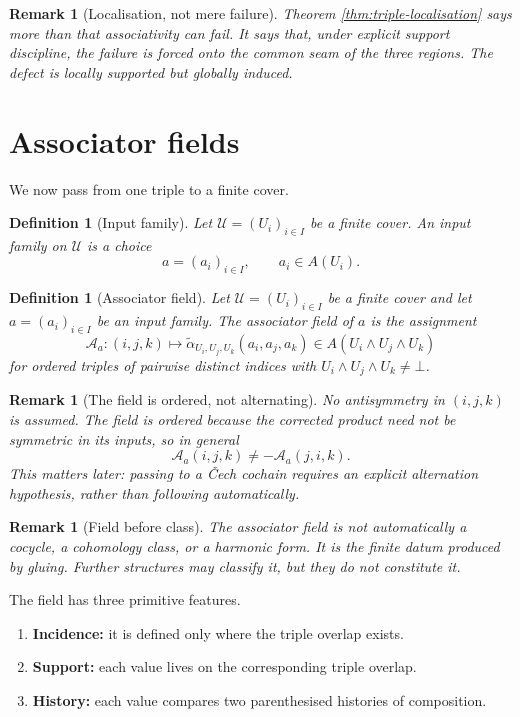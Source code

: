 \documentclass[11pt]{article}
\newtheorem{definition}[theorem]{Definition}
\newtheorem{remark}[theorem]{Remark}
\begin{document}
\begin{remark}[Localisation, not mere failure]
Theorem \ref{thm:triple-localisation} says more than that associativity can fail. It says that, under explicit support discipline, the failure is forced onto the common seam of the three regions. The defect is locally supported but globally induced.
\end{remark}

\section{Associator fields}

We now pass from one triple to a finite cover.

\begin{definition}[Input family]
Let \(\mathcal U=(U_i)_{i\in I}\) be a finite cover. An input family on \(\mathcal U\) is a choice
\[
a=(a_i)_{i\in I},
\qquad
 a_i\in A(U_i).
\]
\end{definition}

\begin{definition}[Associator field]
Let \(\mathcal U=(U_i)_{i\in I}\) be a finite cover and let \(a=(a_i)_{i\in I}\) be an input family. The associator field of \(a\) is the assignment
\[
\mathcal A_a:(i,j,k)\longmapsto
\widetilde\alpha_{U_i,U_j,U_k}(a_i,a_j,a_k)
\in A(U_i\wedge U_j\wedge U_k)
\]
for ordered triples of pairwise distinct indices with \(U_i\wedge U_j\wedge U_k\neq \bot\).
\end{definition}

\begin{remark}[The field is ordered, not alternating]
No antisymmetry in \((i,j,k)\) is assumed. The field is ordered because the corrected product need not be symmetric in its inputs, so in general
\[
\mathcal A_a(i,j,k)\neq -\mathcal A_a(j,i,k).
\]
This matters later: passing to a \v{C}ech cochain requires an explicit alternation hypothesis, rather than following automatically.
\end{remark}

\begin{remark}[Field before class]
The associator field is not automatically a cocycle, a cohomology class, or a harmonic form. It is the finite datum produced by gluing. Further structures may classify it, but they do not constitute it.
\end{remark}

The field has three primitive features.

\begin{enumerate}[label=(\roman*)]
\item \textbf{Incidence:} it is defined only where the triple overlap exists.
\item \textbf{Support:} each value lives on the corresponding triple overlap.
\item \textbf{History:} each value compares two parenthesised histories of composition.
\end{enumerate}
\end{document}

